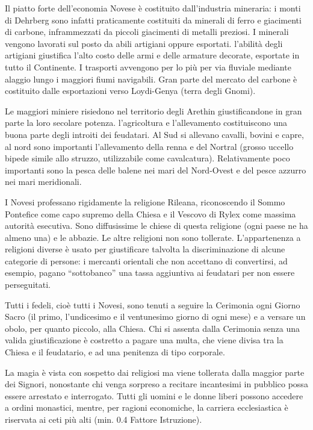 Il piatto forte dell'economia Novese \`e costituito dall'industria
mineraria: i monti di Dehrberg sono infatti praticamente costituiti da
minerali di ferro e giacimenti di carbone, inframmezzati da piccoli
giacimenti di metalli preziosi. I minerali vengono lavorati sul posto
da abili artigiani oppure esportati.  l'abilit\`a degli artigiani
giustifica l'alto costo delle armi e delle armature decorate,
esportate in tutto il Continente.  I trasporti avvengono per lo
pi\`u per via fluviale mediante alaggio lungo i maggiori fiumi
navigabili. Gran parte del mercato del carbone \`e costituito dalle
esportazioni verso Loydi-Genya (terra degli Gnomi).

Le maggiori miniere risiedono nel territorio degli Arethin
giustificandone in gran parte la loro secolare potenza. l'agricoltura
e l'allevamento costituiscono una buona parte degli introiti dei
feudatari. Al Sud si allevano cavalli, bovini e capre, al nord sono
importanti l'allevamento della renna e del Nortral (grosso uccello
bipede simile allo struzzo, utilizzabile come cavalcatura).
Relativamente poco importanti sono la pesca delle balene nei mari del
Nord-Ovest e del pesce azzurro nei mari meridionali. 

\Religione I Novesi professano rigidamente la religione Rileana,
riconoscendo il Sommo Pontefice come capo supremo della Chiesa e il
Vescovo di Rylex come massima autorit\`a esecutiva. Sono diffusissime
le chiese di questa religione (ogni paese ne ha almeno una) e le
abbazie. Le altre religioni non sono tollerate.  L'appartenenza a
religioni diverse \`e usato per giustificare talvolta la
discriminazione di alcune categorie di persone: i mercanti orientali
che non accettano di convertirsi, ad esempio, pagano ``sottobanco''
una tassa aggiuntiva ai feudatari per non essere perseguitati.

Tutti i fedeli, cio\`e tutti i Novesi, sono tenuti a seguire la
Cerimonia ogni Giorno Sacro (il primo, l'undicesimo e il ventunesimo
giorno di ogni mese) e a versare un obolo, per quanto piccolo, alla
Chiesa. Chi si assenta dalla Cerimonia senza una valida
giustificazione \`e costretto a pagare una multa, che viene divisa
tra la Chiesa e il feudatario, e ad una penitenza di tipo corporale.

La magia \`e vista con sospetto dai religiosi ma viene tollerata dalla
maggior parte dei Signori, nonostante chi venga sorpreso a recitare
incantesimi in pubblico possa essere arrestato e interrogato.  Tutti
gli uomini e le donne liberi possono accedere a ordini monastici,
mentre, per ragioni economiche, la carriera ecclesiastica \`e
riservata ai ceti pi\`u alti (min. 0.4 Fattore Istruzione).

